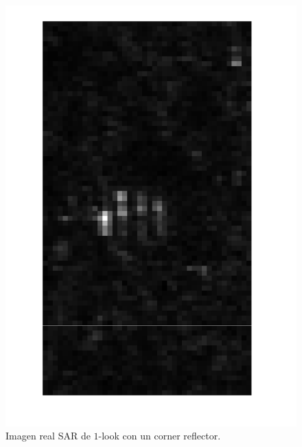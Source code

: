 \begin{figure}[htb]
	\centering
	\includegraphics[angle =90,width=.8\linewidth]{../../Figures/Tesis/Capitulo6/Corner.pdf}
	\caption{\label{ImagenCornerReflector} Imagen real SAR de $1$-look con un corner reflector.}
\end{figure}

